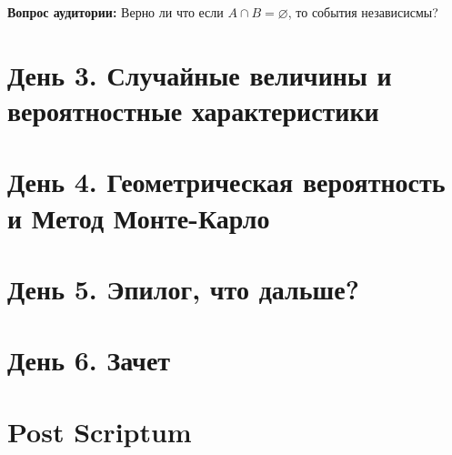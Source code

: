 \documentclass{article}
\theoremstyle{definition}
\newcommand{\question}{\textbf{Вопрос аудитории: }}
\theoremstyle{remark}
\begin{document}
\question{Верно ли что если $A \cap B = \varnothing$, то события независисмы? }

\section{День 3. Случайные величины и вероятностные характеристики}

\section{День 4. Геометрическая вероятность и Метод Монте-Карло}

\section{День 5. Эпилог, что дальше?}

\section{День 6. Зачет}

\section*{Post Scriptum}
\end{document}
